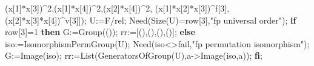\documentclass[
  11pt,
  a4paper,
]{article}
\newenvironment{Shaded}{}{}
\newcommand{\BuiltInTok}[1]{\textcolor[rgb]{0.00,0.50,0.00}{#1}}
\newcommand{\ConstantTok}[1]{\textcolor[rgb]{0.53,0.00,0.00}{#1}}
\newcommand{\ControlFlowTok}[1]{\textcolor[rgb]{0.00,0.44,0.13}{\textbf{#1}}}
\newcommand{\FloatTok}[1]{\textcolor[rgb]{0.25,0.63,0.44}{#1}}
\newcommand{\NormalTok}[1]{#1}
\newcommand{\OperatorTok}[1]{\textcolor[rgb]{0.40,0.40,0.40}{#1}}
\newcommand{\StringTok}[1]{\textcolor[rgb]{0.25,0.44,0.63}{#1}}
\newcommand{\VariableTok}[1]{\textcolor[rgb]{0.10,0.09,0.49}{#1}}
\begin{document}
\begin{Shaded}
\begin{Highlighting}[]
\NormalTok{              (}\VariableTok{x}\NormalTok{[}\FloatTok{1}\NormalTok{]}\OperatorTok{*}\VariableTok{x}\NormalTok{[}\FloatTok{3}\NormalTok{])}\OperatorTok{\^{}}\FloatTok{2}\OperatorTok{,}\NormalTok{(}\VariableTok{x}\NormalTok{[}\FloatTok{1}\NormalTok{]}\OperatorTok{*}\VariableTok{x}\NormalTok{[}\FloatTok{4}\NormalTok{])}\OperatorTok{\^{}}\FloatTok{2}\OperatorTok{,}\NormalTok{(}\VariableTok{x}\NormalTok{[}\FloatTok{2}\NormalTok{]}\OperatorTok{*}\VariableTok{x}\NormalTok{[}\FloatTok{4}\NormalTok{])}\OperatorTok{\^{}}\FloatTok{2}\OperatorTok{,}
\NormalTok{              (}\VariableTok{x}\NormalTok{[}\FloatTok{1}\NormalTok{]}\OperatorTok{*}\VariableTok{x}\NormalTok{[}\FloatTok{2}\NormalTok{]}\OperatorTok{*}\VariableTok{x}\NormalTok{[}\FloatTok{3}\NormalTok{])}\OperatorTok{\^{}}\VariableTok{f}\NormalTok{[}\FloatTok{3}\NormalTok{]}\OperatorTok{,}\NormalTok{(}\VariableTok{x}\NormalTok{[}\FloatTok{2}\NormalTok{]}\OperatorTok{*}\VariableTok{x}\NormalTok{[}\FloatTok{3}\NormalTok{]}\OperatorTok{*}\VariableTok{x}\NormalTok{[}\FloatTok{4}\NormalTok{])}\OperatorTok{\^{}}\VariableTok{v}\NormalTok{[}\FloatTok{3}\NormalTok{]])}\OperatorTok{;}
  \VariableTok{U}\OperatorTok{:=}\VariableTok{F}\OperatorTok{/}\VariableTok{rel}\OperatorTok{;} \VariableTok{Need}\NormalTok{(}\BuiltInTok{Size}\NormalTok{(}\VariableTok{U}\NormalTok{)}\OperatorTok{=}\VariableTok{row}\NormalTok{[}\FloatTok{3}\NormalTok{]}\OperatorTok{,}\StringTok{"fp universal order"}\NormalTok{)}\OperatorTok{;} \ControlFlowTok{if} \VariableTok{row}\NormalTok{[}\FloatTok{3}\NormalTok{]}\OperatorTok{=}\FloatTok{1} \ControlFlowTok{then} \VariableTok{G}\OperatorTok{:=}\BuiltInTok{Group}\NormalTok{(())}\OperatorTok{;} \VariableTok{rr}\OperatorTok{:=}\NormalTok{[()}\OperatorTok{,}\NormalTok{()}\OperatorTok{,}\NormalTok{()}\OperatorTok{,}\NormalTok{()]}\OperatorTok{;} \ControlFlowTok{else} \VariableTok{iso}\OperatorTok{:=}\BuiltInTok{IsomorphismPermGroup}\NormalTok{(}\VariableTok{U}\NormalTok{)}\OperatorTok{;} \VariableTok{Need}\NormalTok{(}\VariableTok{iso}\OperatorTok{\textless{}\textgreater{}}\ConstantTok{fail}\OperatorTok{,}\StringTok{"fp permutation isomorphism"}\NormalTok{)}\OperatorTok{;} \VariableTok{G}\OperatorTok{:=}\BuiltInTok{Image}\NormalTok{(}\VariableTok{iso}\NormalTok{)}\OperatorTok{;} \VariableTok{rr}\OperatorTok{:=}\BuiltInTok{List}\NormalTok{(}\BuiltInTok{GeneratorsOfGroup}\NormalTok{(}\VariableTok{U}\NormalTok{)}\OperatorTok{,}\VariableTok{a}\OperatorTok{{-}\textgreater{}}\BuiltInTok{Image}\NormalTok{(}\VariableTok{iso}\OperatorTok{,}\VariableTok{a}\NormalTok{))}\OperatorTok{;} \ControlFlowTok{fi}\OperatorTok{;}

\end{Highlighting}
\end{Shaded}
\end{document}
